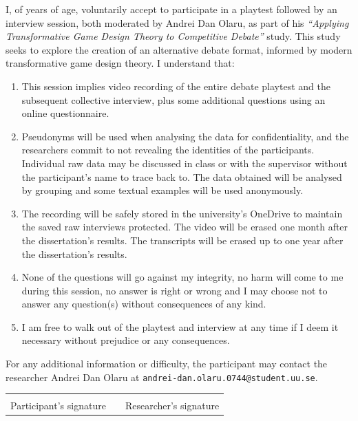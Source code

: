 \documentclass[12pt]{article}
\begin{document}
\bigskip

I, \underline{\hspace{7cm}} of \underline{\hspace{1.5cm}} years of age, voluntarily accept to participate in a playtest followed by an interview session, both moderated by Andrei Dan Olaru, as part of his \textit{``Applying Transformative Game Design Theory to Competitive Debate''} study. This study seeks to explore the creation of an alternative debate format, informed by modern transformative game design theory. I understand that:

\begin{enumerate}
    \item This session implies video recording of the entire debate playtest and the subsequent collective interview, plus some additional questions using an online questionnaire.
    \item Pseudonyms will be used when analysing the data for confidentiality, and the researchers commit to not revealing the identities of the participants. Individual raw data may be discussed in class or with the supervisor without the participant's name to trace back to. The data obtained will be analysed by grouping and some textual examples will be used anonymously.
    \item The recording will be safely stored in the university's OneDrive to maintain the saved raw interviews protected. The video will be erased one month after the dissertation's results. The transcripts will be erased up to one year after the dissertation's results.
    \item None of the questions will go against my integrity, no harm will come to me during this session, no answer is right or wrong and I may choose not to answer any question(s) without consequences of any kind.
    \item I am free to walk out of the playtest and interview at any time if I deem it necessary without prejudice or any consequences.
\end{enumerate}

For any additional information or difficulty, the participant may contact the researcher Andrei Dan Olaru at \texttt{andrei-dan.olaru.0744@student.uu.se}.

\bigskip\bigskip

\noindent
\begin{tabular}{p{6cm} p{1cm} p{6cm}}
\underline{\hspace{6cm}} & & \underline{\hspace{6cm}} \\
Participant's signature & & Researcher's signature \\
\end{tabular}
\end{document}
